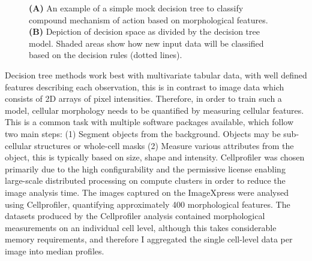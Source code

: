 \documentclass[a4paper,11pt,twoside,openright]{scrbook}
\begin{document}
\begin{figure}
    \captionsetup{width=0.8\textwidth}
    \caption[Diagram of a simple decision tree]{\textbf{(A)} An example of a simple mock decision tree to classify compound mechanism of action based on morphological features. \textbf{(B)} Depiction of decision space as divided by the decision tree model. Shaded areas show how new input data will be classified based on the decision rules (dotted lines).}
    
    \label{figure:decision_tree}
\end{figure}

Decision tree methods work best with multivariate tabular data, with well defined features describing each observation, this is in contrast to image data which consists of 2D arrays of pixel intensities.
Therefore, in order to train such a model, cellular morphology needs to be quantified by measuring cellular features.
This is a common task with multiple software packages available, which follow two main steps: (1) Segment objects from the background. Objects may be sub-cellular structures or whole-cell masks (2) Measure various attributes from the object, this is typically based on size, shape and intensity.
Cellprofiler \cite{Carpenter2006} was chosen primarily due to the high configurability and the permissive license enabling large-scale distributed processing on compute clusters in order to reduce the image analysis time.
The images captured on the ImageXpress were analysed using Cellprofiler, quantifying approximately 400 morphological features.
The datasets produced by the Cellprofiler analysis contained morphological measurements on an individual cell level, although this takes considerable memory requirements, and therefore I aggregated the single cell-level data per image into median profiles.

%
\end{document}
